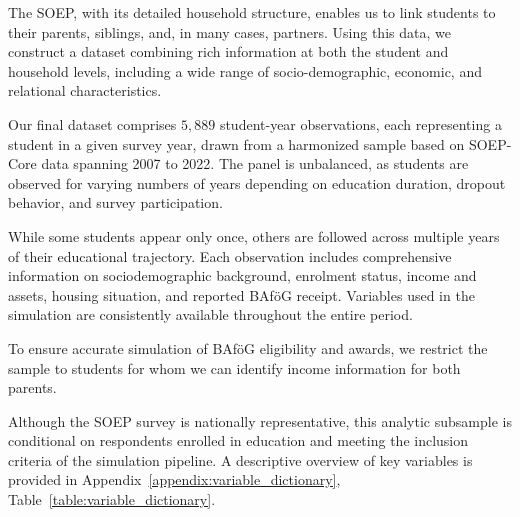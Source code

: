 The SOEP, with its detailed household structure, enables us to link students to their parents, siblings, and, in many cases, partners. Using this data, we construct a dataset combining rich information at both the student and household levels, including a wide range of socio-demographic, economic, and relational characteristics.

Our final dataset comprises \(5{,}889\) student-year observations, each representing a student in a given survey year, drawn from a harmonized sample based on SOEP-Core data spanning 2007 to 2022. The panel is unbalanced, as students are observed for varying numbers of years depending on education duration, dropout behavior, and survey participation.

While some students appear only once, others are followed across multiple years of their educational trajectory. Each observation includes comprehensive information on sociodemographic background, enrolment status, income and assets, housing situation, and reported BAföG receipt. Variables used in the simulation are consistently available throughout the entire period.

To ensure accurate simulation of BAföG eligibility and awards, we restrict the sample to students for whom we can identify income information for both parents. 

Although the SOEP survey is nationally representative, this analytic subsample is conditional on respondents enrolled in education and meeting the inclusion criteria of the simulation pipeline. A descriptive overview of key variables is provided in Appendix~\ref{appendix:variable_dictionary}, Table~\ref{table:variable_dictionary}.



